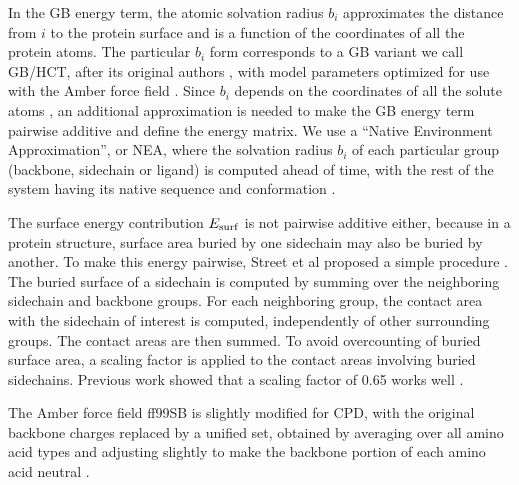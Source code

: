 \documentclass[12pt]{article}
\begin{document}
In the GB energy term, the atomic solvation radius $b_i$ approximates the distance from $i$ to the protein
surface and is a function of the coordinates of all the protein atoms. The particular $b_i$ form corresponds
to a GB variant we call GB/HCT, after its original authors \cite{Hawkins95}, with model parameters optimized
for use with the Amber force field \cite{Lopes07}. Since $b_i$ depends on the coordinates of all the solute
atoms \cite{Hawkins95}, an additional approximation is needed to make the GB energy term pairwise additive
and define the energy matrix. We use a ``Native Environment Approximation'', or NEA, where the solvation radius
$b_i$ of each particular group (backbone, sidechain or ligand) is computed ahead of time, with the rest of the
system having its native sequence and conformation \cite{Simonson13b,Gaillard14}.

The surface energy contribution $E_{\rm surf}$ is not pairwise additive either, because in a protein structure,
surface area buried by one sidechain may also be buried by another. To make this energy pairwise, Street et al
proposed a simple procedure \cite{Street98}. The buried surface of a sidechain is computed by summing over the
neighboring sidechain and backbone groups. For each neighboring group, the contact area with the sidechain of
interest is computed, independently of other surrounding groups. The contact areas are then summed. To avoid
overcounting of buried surface area, a scaling factor is applied to the contact areas involving buried sidechains.
Previous work showed that a scaling factor of 0.65 works well \cite{Lopes07,Gaillard14}.

The Amber force field ff99SB is slightly modified for CPD, with the original backbone charges replaced by a unified
set, obtained by averaging over all amino acid types and adjusting slightly to make the backbone portion of each
amino acid neutral \cite{Aleksandrov10b}. 
\end{document}
